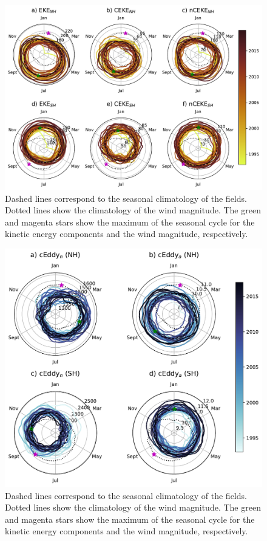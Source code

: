 \documentclass[draft]{agujournal2019}
\begin{document}
	\begin{figure}
	    \centering
	    \includegraphics[width=1\textwidth]{figures/All_polar_plots.pdf}
	    \caption{Dashed lines correspond to the seasonal climatology of the fields. Dotted lines show the climatology of the wind magnitude. The green and magenta stars show the maximum of the seasonal cycle for the kinetic energy components and the wind magnitude, respectively. }
	    \label{fig:my_label}
	\end{figure}


	\begin{figure}
	    \centering
	    \includegraphics[width=1\textwidth]{figures//All_polar_plots_eddy_stats.pdf}
	    \caption{Dashed lines correspond to the seasonal climatology of the fields. Dotted lines show the climatology of the wind magnitude. The green and magenta stars show the maximum of the seasonal cycle for the kinetic energy components and the wind magnitude, respectively. }
	    \label{fig:my_label}
	\end{figure}
\end{document}
